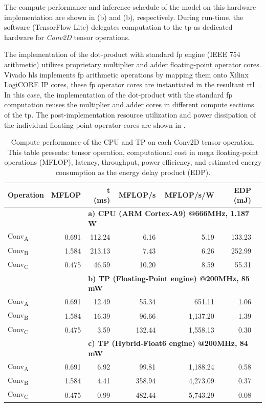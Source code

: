 The compute performance and inference schedule of the model on this hardware implementation are shown in (b) and (b), respectively. During run-time, the software (TensorFlow Lite) delegates computation to the \gls{tp} as dedicated hardware for \emph{Conv2D} tensor operations.

The implementation of the dot-product with standard \gls{fp} engine (IEEE 754 arithmetic) utilizes proprietary multiplier and adder floating-point operator cores. Vivado \gls{hls} implements \gls{fp} arithmetic operations by mapping them onto Xilinx LogiCORE IP cores, these \gls{fp} operator cores are instantiated in the resultant \gls{rtl}~\cite{hrica2012floating}. In this case, the implementation of the dot-product with the standard \gls{fp} computation reuses the multiplier and adder cores in different compute sections of the \gls{tp}. The post-implementation resource utilization and power dissipation of the individual floating-point operator cores are shown in .

\begin{table}[!t]\centering
	\caption{Compute performance of the CPU and TP on each Conv2D tensor operation. This table presents: tensor operation, computational cost in mega floating-point operations (MFLOP), latency, throughput, power efficiency, and estimated energy consumption as the energy delay product (EDP).}\label{tab:performance}
	\scriptsize
	\begin{tabular}{lrrrrrr}\toprule
		\textbf{Operation} &\textbf{MFLOP} &\textbf{t (ms)} &\textbf{MFLOP/s} &\textbf{MFLOP/s/W} &\textbf{EDP (mJ)} \\\midrule
		& &\multicolumn{4}{l}{\textbf{a) CPU (ARM Cortex-A9) @666MHz, 1.187 W}} \\
		Conv\textsubscript{A} &0.691 &112.24 &6.16 &5.19 &133.23 \\
		Conv\textsubscript{B} &1.584 &213.13 &7.43 &6.26 &252.99 \\
		Conv\textsubscript{C} &0.475 &46.59 &10.20 &8.59 &55.31 \\
		& &\multicolumn{4}{l}{\textbf{b) TP (Floating-Point engine) @200MHz, 85 mW}} \\
		Conv\textsubscript{A} &0.691 &12.49 &55.34 &651.11 &1.06 \\
		Conv\textsubscript{B} &1.584 &16.39 &96.66 &1,137.20 &1.39 \\
		Conv\textsubscript{C} &0.475 &3.59 &132.44 &1,558.13 &0.30 \\
		& &\multicolumn{4}{l}{\textbf{c) TP (Hybrid-Float6 engine) @200MHz, 84 mW}} \\
		Conv\textsubscript{A} &0.691 &6.92 &99.81 &1,188.24 &0.58 \\
		Conv\textsubscript{B} &1.584 &4.41 &358.94 &4,273.09 &0.37 \\
		Conv\textsubscript{C} &0.475 &0.99 &482.44 &5,743.29 &0.08 \\
		\bottomrule
	\end{tabular}
\end{table}

